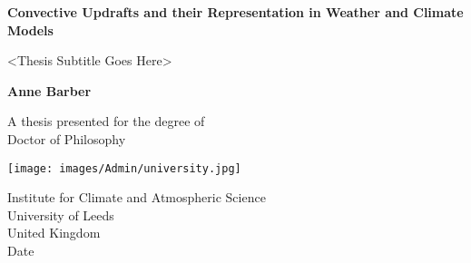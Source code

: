 \begin{titlepage}
   \begin{center}
       \vspace*{1cm}
 
       \Huge
       \textbf{Convective Updrafts and their Representation in Weather and Climate Models}
 
       \vspace{0.5cm}
       \Large
        <Thesis Subtitle Goes Here>
 
       \vspace{1.5cm}
 
       \textbf{Anne Barber}
 
       \vfill
 
       A thesis presented for the degree of\\
       Doctor of Philosophy
 
       \vspace{0.8cm}
 
       \texttt{[image: images/Admin/university.jpg]}
 
       \Large
       Institute for Climate and Atmospheric Science\\
       University of Leeds\\
       United Kingdom\\
       Date
 
   \end{center}
\end{titlepage}